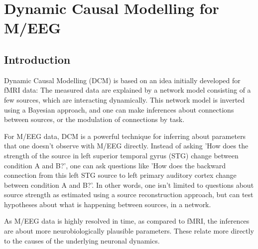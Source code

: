 \chapter{Dynamic Causal Modelling for M/EEG \label{Chap:eeg:DCM}}

\section{Introduction}
Dynamic Causal Modelling (DCM) is based on an idea initially developed for fMRI
data: The measured data are explained by a network model consisting of
a few sources, which are interacting dynamically. This network model
is inverted using a Bayesian approach, and one can make inferences
about connections between sources,
or the modulation of connections by task.

For M/EEG data, DCM
is a powerful technique for inferring about parameters that one
doesn't observe with M/EEG directly. Instead of asking 'How does the
 strength of the source in left superior temporal gyrus (STG) change
between condition A and B?', one can ask questions like 'How does the backward
connection from this left STG source to left primary auditory cortex
change between condition A and B?'. In other words, one isn't limited
to questions about source strength as estimated using a source
reconstruction approach, but can test hypotheses about what is
happening between sources, in a network.

As M/EEG data is highly resolved
in time, as compared to fMRI, the inferences are about more neurobiologically plausible
parameters. These relate more directly to the causes of the underlying
neuronal dynamics.

